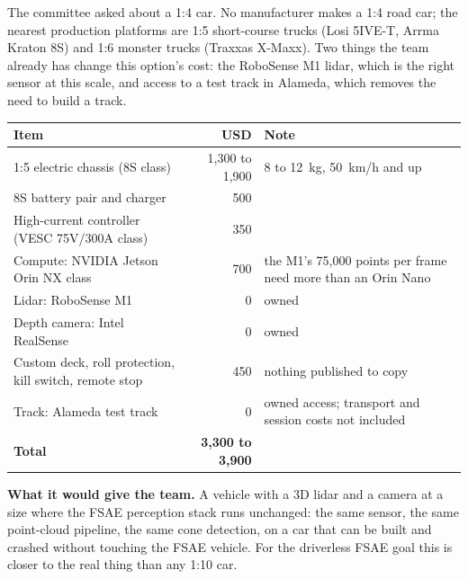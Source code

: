 \documentclass[11pt,a4paper]{article}
\begin{document}
The committee asked about a 1:4 car. No manufacturer makes a 1:4 road car; the nearest
production platforms are 1:5 short-course trucks (Losi 5IVE-T, Arrma Kraton 8S) and 1:6
monster trucks (Traxxas X-Maxx). Two things the team already has change this option's cost:
the RoboSense M1 lidar, which is the right sensor at this scale, and access to a test track in
Alameda, which removes the need to build a track.

\begin{tabularx}{\linewidth}{p{6.2cm}rX}
\toprule
Item & USD & Note \\
\midrule
1:5 electric chassis (8S class) & 1{,}300 to 1{,}900 & 8 to 12~kg, 50~km/h and up \\
8S battery pair and charger & 500 & \\
High-current controller (VESC 75V/300A class) & 350 & \\
Compute: NVIDIA Jetson Orin NX class & 700 & the M1's 75{,}000 points per frame need more than an Orin Nano \\
Lidar: RoboSense M1 & 0 & owned \\
Depth camera: Intel RealSense & 0 & owned \\
Custom deck, roll protection, kill switch, remote stop & 450 & nothing published to copy \\
Track: Alameda test track & 0 & owned access; transport and session costs not included \\
\midrule
\textbf{Total} & \textbf{3{,}300 to 3{,}900} & \\
\bottomrule
\end{tabularx}

\medskip
\textbf{What it would give the team.} A vehicle with a 3D lidar and a camera at a size where
the FSAE perception stack runs unchanged: the same sensor, the same point-cloud pipeline, the
same cone detection, on a car that can be built and crashed without touching the FSAE
vehicle. For the driverless FSAE goal this is closer to the real thing than any 1:10 car.
\end{document}
